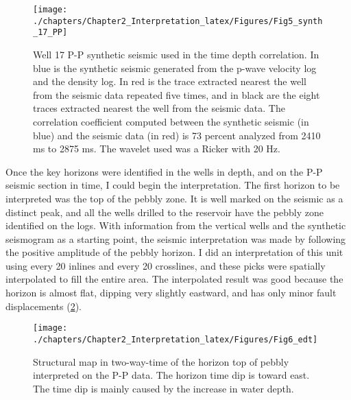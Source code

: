 \begin{figure}[hbtp]
	\begin{center}
	\texttt{[image: ./chapters/Chapter2\_Interpretation\_latex/Figures/Fig5\_synth\_17\_PP]}
			\caption[Well 17 P-P synthetic seismic.]{Well 17 P-P synthetic seismic used in the time depth correlation. In blue is the synthetic seismic generated from the p-wave velocity log and the density log. In red is the trace extracted nearest the well from the seismic data repeated five times, and in black are the eight traces extracted nearest the well from the seismic data. The correlation coefficient computed between the synthetic seismic (in blue) and the seismic data (in red) is 73 percent analyzed from 2410 ms to 2875 ms. The wavelet used was a Ricker with 20 Hz.}
			\label{fig:synth_PP_17}
		\end{center}
	\end{figure}

	
Once the key horizons were identified in the wells in depth, and on the P-P seismic section in time, I could begin the interpretation. The first horizon to be interpreted was the top of the pebbly zone. It is well marked on the seismic as a distinct peak, and all the wells drilled to the reservoir have the pebbly zone identified on the logs. With information from the vertical wells and the synthetic seismogram as a starting point, the seismic interpretation was made by following the positive amplitude of the pebbly horizon. I did an interpretation of this unit using every 20 inlines and every 20 crosslines, and these picks were spatially interpolated to fill the entire area. The interpolated result was good because the horizon is almost flat, dipping very slightly eastward, and has only minor fault displacements (\ref{fig:map_PB_time}). 
	
\begin{figure}[hbtp]
	\begin{center}
	\texttt{[image: ./chapters/Chapter2\_Interpretation\_latex/Figures/Fig6\_edt]}
			\caption[Structural map in two-way-time of the horizon top of pebbly interpreted on the P-P data.]{Structural map in two-way-time of the horizon top of pebbly interpreted on the P-P data. The horizon time dip is toward east. The time dip is mainly caused by the increase in water depth. }
			\label{fig:map_PB_time}
		\end{center}
	\end{figure}	
	
